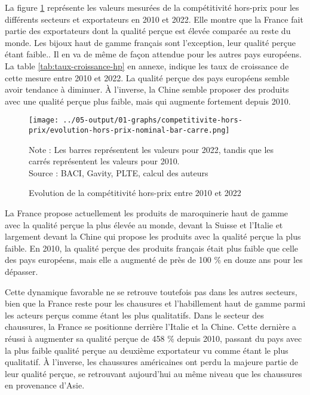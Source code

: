 \documentclass[french,10pt,a4paper]{article}
\begin{document}
La figure \ref{fig:hors-prix} représente les valeurs mesurées de la compétitivité hors-prix pour les différents secteurs et exportateurs en 2010 et 2022. Elle montre que la France fait partie des exportateurs dont la qualité perçue est élevée comparée au reste du monde. Les bijoux haut de gamme français sont l'exception, leur qualité perçue étant faible.. Il en va de même de façon attendue pour les autres pays européens. La table \ref{tab:taux-croissance-hp} en annexe, indique les taux de croissance de cette mesure entre 2010 et 2022. La qualité perçue des pays européens semble avoir tendance à diminuer. À l'inverse, la Chine semble proposer des produits avec une qualité perçue plus faible, mais qui augmente fortement depuis 2010.

\begin{figure}[!h]
  \centering
  \texttt{[image: ../05-output/01-graphs/competitivite-hors-prix/evolution-hors-prix-nominal-bar-carre.png]}
  \captionsetup{justification=justified, singlelinecheck=false, font=small}
  \caption*{Note : Les barres représentent les valeurs pour 2022, tandis que les carrés représentent les valeurs pour 2010. \\
  Source : BACI, Gavity, PLTE, calcul des auteurs}
  \captionsetup{justification=centering, singlelinecheck=true, font=normalsize}
  \caption{Evolution de la compétitivité hors-prix entre 2010 et 2022}
  \label{fig:hors-prix}
\end{figure}

\bigskip

La France propose actuellement les produits de maroquinerie haut de gamme avec la qualité perçue la plus élevée au monde, devant la Suisse et l'Italie et largement devant la Chine qui propose les produits avec la qualité perçue la plus faible. En 2010, la qualité perçue des produits français était plus faible que celle des pays européens, mais elle a augmenté de près de 100 \% en douze ans pour les dépasser.

Cette dynamique favorable ne se retrouve toutefois pas dans les autres secteurs, bien que la France reste pour les chausures et l'habillement haut de gamme parmi les acteurs perçus comme étant les plus qualitatifs. Dans le secteur des chaussures, la France se positionne derrière l'Italie et la Chine. Cette dernière a réussi à augmenter sa qualité perçue de 458 \% depuis 2010, passant du pays avec la plus faible qualité perçue au deuxième exportateur vu comme étant le plus qualitatif. À l'inverse, les chaussures américaines ont perdu la majeure partie de leur qualité perçue, se retrouvant aujourd'hui au même niveau que les chaussures en provenance d'Asie.
\end{document}
